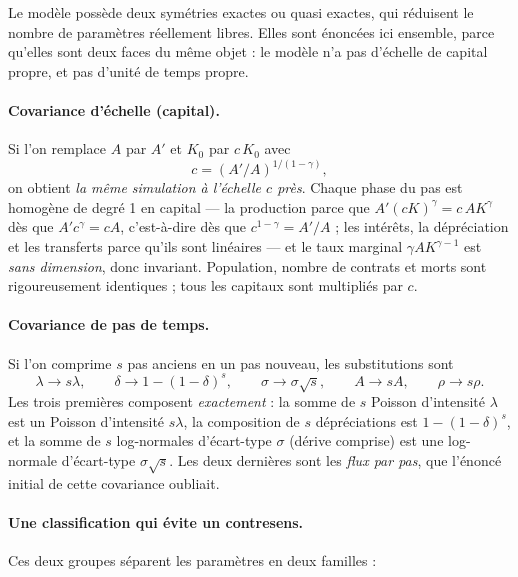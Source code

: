 Le modèle possède deux symétries exactes ou quasi exactes, qui réduisent le
nombre de paramètres réellement libres. Elles sont énoncées ici ensemble,
parce qu'elles sont deux faces du même objet : le modèle n'a pas d'échelle de
capital propre, et pas d'unité de temps propre.

\paragraph{Covariance d'échelle (capital).} Si l'on remplace $A$ par $A'$ et
$K_0$ par $c\,K_0$ avec
\begin{equation}
c = (A'/A)^{1/(1-\gamma)},
\label{eq:covechelle}
\end{equation}
on obtient \emph{la même simulation à l'échelle $c$ près}. Chaque phase du
pas est homogène de degré 1 en capital --- la production parce que
$A'(cK)^{\gamma} = c\,A K^{\gamma}$ dès que $A'c^{\gamma} = cA$, c'est-à-dire
dès que $c^{1-\gamma} = A'/A$ ; les intérêts, la dépréciation et les
transferts parce qu'ils sont linéaires --- et le taux marginal
$\gamma A K^{\gamma-1}$ est \emph{sans dimension}, donc invariant. Population,
nombre de contrats et morts sont rigoureusement identiques ; tous les
capitaux sont multipliés par $c$.

\paragraph{Covariance de pas de temps.} Si l'on comprime $s$ pas anciens en
un pas nouveau, les substitutions sont
\begin{equation}
\lambda \to s\lambda, \qquad
\delta \to 1-(1-\delta)^{s}, \qquad
\sigma \to \sigma\sqrt{s}, \qquad
A \to sA, \qquad
\rho \to s\rho .
\label{eq:covtemps}
\end{equation}
Les trois premières composent \emph{exactement} : la somme de $s$ Poisson
d'intensité $\lambda$ est un Poisson d'intensité $s\lambda$, la composition
de $s$ dépréciations est $1-(1-\delta)^{s}$, et la somme de $s$ log-normales
d'écart-type $\sigma$ (dérive comprise) est une log-normale d'écart-type
$\sigma\sqrt{s}$. Les deux dernières sont les \emph{flux par pas}, que
l'énoncé initial de cette covariance oubliait.

\paragraph{Une classification qui évite un contresens.} Ces deux groupes
séparent les paramètres en deux familles :

